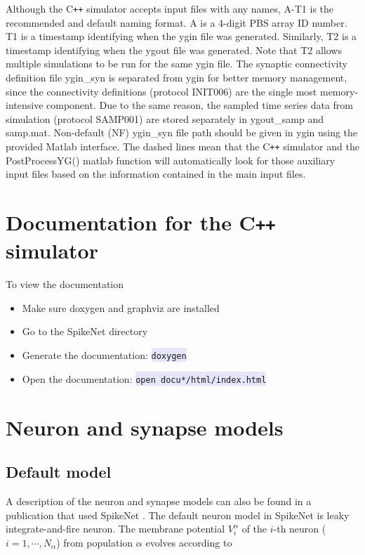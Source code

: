 \documentclass{article}
\newcommand{\mylstinline}[1] {\colorbox{Lavender}{\lstinline[basicstyle=\ttfamily\footnotesize\color{Black}]|#1|} }
\begin{document}
Although the C\texttt{++} simulator accepts input files with any names, A-T1 is the recommended and default naming format.
A is a 4-digit PBS array ID number.
T1 is a timestamp identifying when the ygin file was generated.
Similarly, T2 is a timestamp identifying when the ygout file was generated.
Note that T2 allows multiple simulations to be run for the same ygin file.
The synaptic connectivity definition file ygin\_syn is separated from ygin for better memory management, since the connectivity definitions (protocol INIT006) are the single most memory-intensive component.
Due to the same reason, the sampled time series data from simulation (protocol SAMP001) are stored separately in ygout\_samp and samp.mat.
Non-default (NF) ygin\_syn file path should be given in ygin using the provided Matlab interface.
The dashed lines mean that the C\texttt{++} simulator and the PostProcessYG() matlab function will automatically look for those auxiliary input files based on the information contained in the main input files.


\section{Documentation for the C\texttt{++} simulator}
To view the documentation
\begin{itemize}
\item Make sure doxygen and graphviz are installed
\item Go to the SpikeNet directory
\item Generate the documentation: \mylstinline{doxygen}
\item Open the documentation: \mylstinline{open docu*/html/index.html}
\end{itemize}



\section{Neuron and synapse models}
\label{sec:model}

\subsection{Default model}
A description of the neuron and synapse models can also be found in a publication that used SpikeNet \cite{Gu2016}.
The default neuron model in SpikeNet is leaky integrate-and-fire neuron. 
The membrane potential $V^{\alpha}_{i}$ of the $i$-th neuron ($i=1,\cdots,N_{\alpha}$) from population $\alpha$ evolves according to
\end{document}
